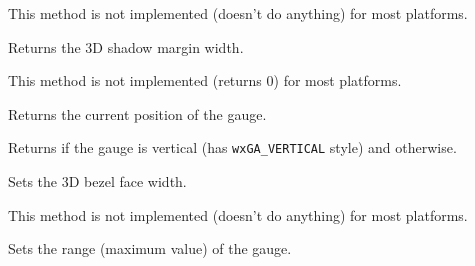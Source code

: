 
This method is not implemented (doesn't do anything) for most platforms.




\label{wxgaugegetshadowwidth}


Returns the 3D shadow margin width.


This method is not implemented (returns $0$) for most platforms.




\label{wxgaugegetvalue}


Returns the current position of the gauge.




\label{wxgaugeisvertical}


Returns \true if the gauge is vertical (has \texttt{wxGA\_VERTICAL} style) and 
\false otherwise.


\label{wxgaugesetbezelface}


Sets the 3D bezel face width.


This method is not implemented (doesn't do anything) for most platforms.




\label{wxgaugesetrange}


Sets the range (maximum value) of the gauge.





